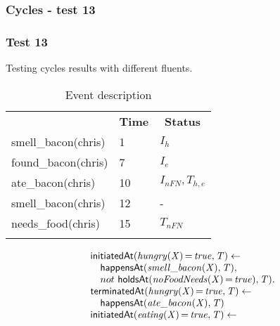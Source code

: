 \documentclass[8pt]{beamer}
\DeclareMathOperator{\val}{=}  %
\def \patsize {}
\def\happensAt{\textsf{\patsize happensAt}}
\def\holdsAt{\textsf{\patsize holdsAt}}
\def\initiatedAt{\textsf{\patsize initiatedAt}}
\def\terminatedAt{\textsf{\patsize terminatedAt}}
\newenvironment{mysplit}%
  {\arraycolsep 0pt \begin{array}{l}}%
  {\end{array}}
\begin{document}
\begin{frame}
    \frametitle{Cycles - test 13}
    \subsubsection{Test 13}
    \small
    Testing cycles results with different fluents.\linebreak
    \begin{minipage}{0.4\linewidth}
        \begin{table}[t!]
            \caption{Event description}
            \begin{center}

                \begin{tabular}{lll}
                    \hline\noalign{\smallskip}
                    \multicolumn{1}{l}{\textbf{Event}} & \multicolumn{1}{c}{\textbf{Time}} & \multicolumn{1}{c}{\textbf{Status}} \\
                    smell\_bacon(chris)& 1 & $I_{h}$\\
                    found\_bacon(chris)& 7 & $I_{e}$\\
                    ate\_bacon(chris)& 10  & $I_{nFN},T_{h,e}$\\
                    smell\_bacon(chris)& 12 & -\\
                    needs\_food(chris)& 15 & $T_{nFN}$\\
                    \noalign{\smallskip}
                    \hline
                \end{tabular}
            \end{center}
        \end{table}
    \end{minipage}
    \begin{minipage}{0.55\linewidth}
        \begin{align*}
            \begin{mysplit}
                \initiatedAt\mathit{(hungry(X)\val true,T)\leftarrow}\\
                \quad    \happensAt\mathit{(smell\_bacon(X),T),}\\
                \quad    not\ \holdsAt\mathit{(noFoodNeeds(X)\val true),T).}\\
                \terminatedAt\mathit{(hungry(X)\val true,T)\leftarrow}\\
                \quad    \happensAt\mathit{(ate\_bacon(X),T)}\\
                \initiatedAt\mathit{(eating(X)\val true,T)\leftarrow}\\

\end{mysplit}
\end{align*}
\end{minipage}
\end{frame}
\end{document}
